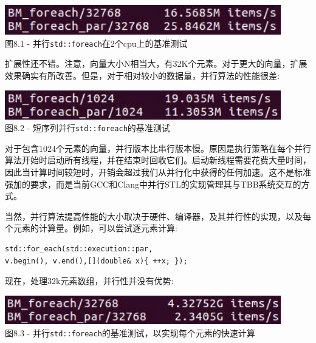 \begin{center}
\includegraphics[width=0.9\textwidth]{content/2/chapter8/images/1.jpg}\\
图8.1 - 并行\texttt{std::foreach}在2个cpu上的基准测试
\end{center}

扩展性还不错。注意，向量大小N相当大，有32K个元素。对于更大的向量，扩展效果确实有所改善。但是，对于相对较小的数据量，并行算法的性能很差:

\begin{center}
\includegraphics[width=0.9\textwidth]{content/2/chapter8/images/2.jpg}\\
图8.2 - 短序列并行\texttt{std::foreach}的基准测试
\end{center}

对于包含1024个元素的向量，并行版本比串行版本慢。原因是执行策略在每个并行算法开始时启动所有线程，并在结束时回收它们。启动新线程需要花费大量时间，因此当计算时间较短时，开销会超过我们从并行化中获得的任何加速。这不是标准强加的要求，而是当前GCC和Clang中并行STL的实现管理其与TBB系统交互的方式。 

当然，并行算法提高性能的大小取决于硬件、编译器，及其并行性的实现，以及每个元素的计算量。例如，可以尝试逐元素计算:

\begin{lstlisting}[style=styleCXX]
std::for_each(std::execution::par,
v.begin(), v.end(),[](double& x){ ++x; });
\end{lstlisting}

现在，处理32k元素数组，并行性并没有优势:

\begin{center}
\includegraphics[width=0.9\textwidth]{content/2/chapter8/images/3.jpg}\\
图8.3 - 并行\texttt{std::foreach}的基准测试，以实现每个元素的快速计算
\end{center}

